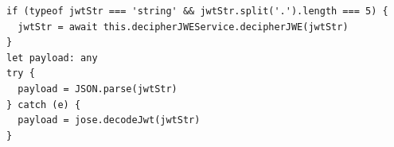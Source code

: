 \begin{listing}[H]
\begin{verbatim}
if (typeof jwtStr === 'string' && jwtStr.split('.').length === 5) {
  jwtStr = await this.decipherJWEService.decipherJWE(jwtStr)
}
let payload: any
try {
  payload = JSON.parse(jwtStr)
} catch (e) {
  payload = jose.decodeJwt(jwtStr)
}
\end{verbatim}
\caption{Discriminazione tra \textit{payload} in chiaro e \textit{payload} cifrato nella risposta del \textit{Wallet}}
\label{listing:discriminazione_payload}
\end{listing}